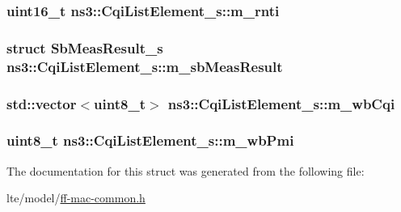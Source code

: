 \subsubsection[{\texorpdfstring{m\+\_\+rnti}{m_rnti}}]{\setlength{\rightskip}{0pt plus 5cm}uint16\+\_\+t ns3\+::\+Cqi\+List\+Element\+\_\+s\+::m\+\_\+rnti}\hypertarget{structns3_1_1CqiListElement__s_ad89fb6c5819526727ae5c8d8e9a7b0df}{}\label{structns3_1_1CqiListElement__s_ad89fb6c5819526727ae5c8d8e9a7b0df}
\subsubsection[{\texorpdfstring{m\+\_\+sb\+Meas\+Result}{m_sbMeasResult}}]{\setlength{\rightskip}{0pt plus 5cm}struct {\bf Sb\+Meas\+Result\+\_\+s} ns3\+::\+Cqi\+List\+Element\+\_\+s\+::m\+\_\+sb\+Meas\+Result}\hypertarget{structns3_1_1CqiListElement__s_a40db809ad4749427bdd559413cce5203}{}\label{structns3_1_1CqiListElement__s_a40db809ad4749427bdd559413cce5203}
\subsubsection[{\texorpdfstring{m\+\_\+wb\+Cqi}{m_wbCqi}}]{\setlength{\rightskip}{0pt plus 5cm}std\+::vector$<$uint8\+\_\+t$>$ ns3\+::\+Cqi\+List\+Element\+\_\+s\+::m\+\_\+wb\+Cqi}\hypertarget{structns3_1_1CqiListElement__s_a0f6ddce8f9219b61f754ae85f8a57c57}{}\label{structns3_1_1CqiListElement__s_a0f6ddce8f9219b61f754ae85f8a57c57}
\subsubsection[{\texorpdfstring{m\+\_\+wb\+Pmi}{m_wbPmi}}]{\setlength{\rightskip}{0pt plus 5cm}uint8\+\_\+t ns3\+::\+Cqi\+List\+Element\+\_\+s\+::m\+\_\+wb\+Pmi}\hypertarget{structns3_1_1CqiListElement__s_ab37f381bf266975d5d0d3c8d4c288f6d}{}\label{structns3_1_1CqiListElement__s_ab37f381bf266975d5d0d3c8d4c288f6d}


The documentation for this struct was generated from the following file\+:\begin{DoxyCompactItemize}
\item 
lte/model/\hyperlink{ff-mac-common_8h}{ff-\/mac-\/common.\+h}\end{DoxyCompactItemize}
